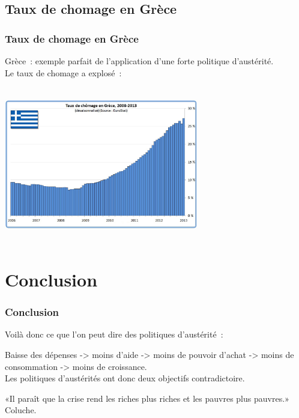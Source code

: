 \documentclass[t]{beamer}
\begin{document}
\subsection{Taux de chomage en Grèce}
\begin{frame}
\frametitle{Taux de chomage en Grèce}
Grèce~: exemple parfait de l'application d'une forte politique d'austérité. \\
\pause
Le taux de chomage a explosé~:
\begin{center}
\includegraphics[width=8.5cm, height=6.8cm]{image/chomage_grece.jpg}
\end{center}
\end{frame}

\section{Conclusion}
\begin{frame}
	\frametitle{Conclusion}
	Voilà donc ce que l'on peut dire des politiques d'austérité~:
	\bigskip
	
	Baisse des dépenses -> moins d'aide -> moins de pouvoir d'achat -> moins de consommation -> moins de croissance. \\
	\pause
	Les politiques d'austérités ont donc deux objectifs contradictoire.
	\pause
	\bigskip
	
	«Il paraît que la crise rend les riches plus riches et les pauvres plus pauvres.» Coluche.

\end{frame}
\end{document}
